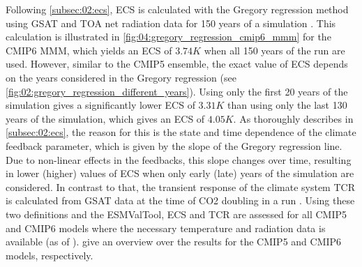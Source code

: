Following \cref{subsec:02:ecs}, \ac{ECS} is calculated with the Gregory
regression method using \ac{GSAT} and \ac{TOA} net radiation data for 150 years
of a  simulation \autocite{Gregory2004}. This calculation is
illustrated in \cref{fig:04:gregory_regression_cmip6_mmm} for the \acs{CMIP}6
\ac{MMM}, which yields an \ac{ECS} of $3.74 \unit{K}$ when all 150 years of the
run are used. However, similar to the \acs{CMIP}5 ensemble, the exact value of
\ac{ECS} depends on the years considered in the Gregory regression (see
\cref{fig:02:gregory_regression_different_years}). Using only the first 20
years of the simulation gives a significantly lower \ac{ECS} of $3.31 \unit{K}$
than using only the last 130 years of the simulation, which gives an \ac{ECS}
of $4.05 \unit{K}$. As thoroughly describes in \cref{subsec:02:ecs}, the reason
for this is the state and time dependence of the climate feedback parameter,
which is given by the slope of the Gregory regression line. Due to non-linear
effects in the feedbacks, this slope changes over time, resulting in lower
(higher) values of \ac{ECS} when only early (late) years of the simulation are
considered. In contrast to that, the transient response of the climate system
\ac{TCR} is calculated from \ac{GSAT} data at the time of \ac{CO2} doubling in
a \onepctcotwo{} run . Using
these two definitions and the \ac{ESMValTool}, \ac{ECS} and \ac{TCR} are
assessed for all \acs{CMIP}5 and \acs{CMIP}6 models where the necessary
temperature and radiation data is available (as of \TheMonth{}).
 give an overview over the
results for the \acs{CMIP}5 and \acs{CMIP}6 models, respectively.

